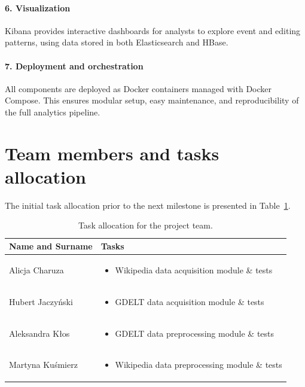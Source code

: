 \documentclass{article}
\begin{document}
\paragraph{6. Visualization}
Kibana provides interactive dashboards for analysts to explore event and editing patterns, using data stored in both Elasticsearch and HBase.

\paragraph{7. Deployment and orchestration}
All components are deployed as Docker containers managed with Docker Compose. This ensures
modular setup, easy maintenance, and reproducibility of the full analytics pipeline.


\section{Team members and tasks allocation}

The initial task allocation prior to the next milestone is presented in Table~\ref{tab:task_allocation}.

\begin{table}[h!]
\centering
\begin{tabular}{| p{4.5cm} | p{7.5cm} |}
\hline
\textbf{Name and Surname} & \textbf{Tasks} \\
\hline
Alicja Charuza &
    \begin{itemize}[nosep, leftmargin=1.5em]
        \item Wikipedia data acquisition module \& tests
    \end{itemize} \\
\hline

Hubert Jaczyński &
    \begin{itemize}[nosep, leftmargin=1.5em]
        \item GDELT data acquisition module \& tests
    \end{itemize} \\
\hline


Aleksandra Kłos &
    \begin{itemize}[nosep, leftmargin=1.5em]
        \item GDELT data preprocessing module \& tests
    \end{itemize} \\
\hline

Martyna Kuśmierz &
    
    \begin{itemize}[nosep, leftmargin=1.5em]
        \item Wikipedia data preprocessing module \& tests
    \end{itemize} \\
\hline
\end{tabular}
\caption{Task allocation for the project team.}
\label{tab:task_allocation}
\end{table}
\end{document}
